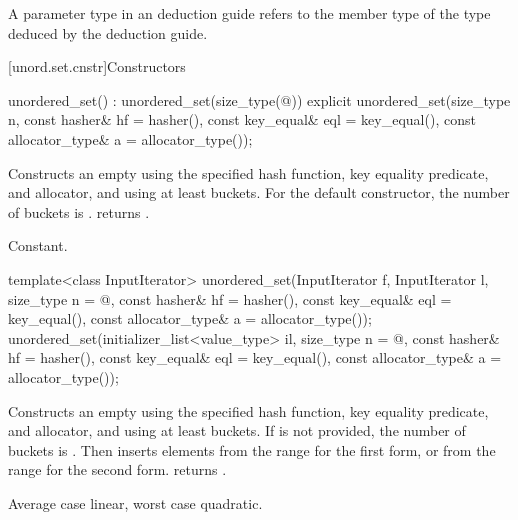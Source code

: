 \pnum
A  parameter type in an  deduction guide
refers to the  member type of
the type deduced by the deduction guide.

[unord.set.cnstr]{Constructors}

%
\begin{itemdecl}
unordered_set() : unordered_set(size_type(@\seebelow@)) { }
explicit unordered_set(size_type n,
                       const hasher& hf = hasher(),
                       const key_equal& eql = key_equal(),
                       const allocator_type& a = allocator_type());
\end{itemdecl}

\begin{itemdescr}
\pnum
\effects Constructs an empty  using the
specified hash function, key equality predicate, and allocator, and
using at least  buckets.  For the default constructor,
the number of buckets is .
 returns .

\pnum
\complexity Constant.
\end{itemdescr}

%
\begin{itemdecl}
template<class InputIterator>
  unordered_set(InputIterator f, InputIterator l,
                size_type n = @\seebelow@,
                const hasher& hf = hasher(),
                const key_equal& eql = key_equal(),
                const allocator_type& a = allocator_type());
unordered_set(initializer_list<value_type> il,
              size_type n = @\seebelow@,
              const hasher& hf = hasher(),
              const key_equal& eql = key_equal(),
              const allocator_type& a = allocator_type());
\end{itemdecl}

\begin{itemdescr}
\pnum
\effects Constructs an empty  using the
specified hash function, key equality predicate, and allocator, and
using at least  buckets. If  is not
provided, the number of buckets is . Then
inserts elements from the range 
for the first form, or from the range
 for the second form.
 returns .

\pnum
\complexity Average case linear, worst case quadratic.
\end{itemdescr}


